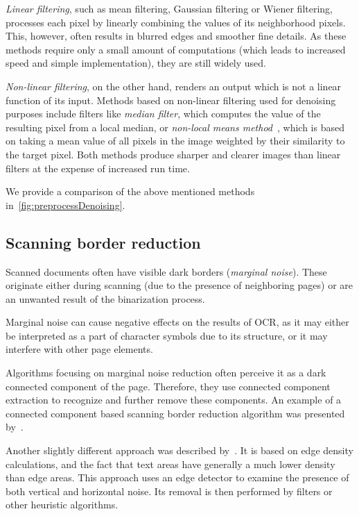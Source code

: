 \emph{Linear filtering}, such as mean filtering, Gaussian filtering or Wiener filtering, processes each pixel by linearly combining the values of its neighborhood pixels. This, however, often results in blurred edges and smoother fine details. As these methods require only a small amount of computations (which leads to increased speed and simple implementation), they are still widely used.

\emph{Non-linear filtering}, on the other hand, renders an output which is not a linear function of its input. Methods based on non-linear filtering used for denoising purposes include filters like \emph{median filter}, which computes the value of the resulting pixel from a local median, or \emph{non-local means method}~\citep{nonLocalMeans}, which is based on taking a mean value of all pixels in the image weighted by their similarity to the target pixel. Both methods produce sharper and clearer images than linear filters at the expense of increased run time.

We provide a comparison of the above mentioned methods in~\cref{fig:preprocessDenoising}.

\subsection{Scanning border reduction}

Scanned documents often have visible dark borders (\emph{marginal noise}). These originate either during scanning (due to the presence of neighboring pages) or are an unwanted result of the binarization process. 

Marginal noise can cause negative effects on the results of OCR, as it may either be interpreted as a part of character symbols due to its structure, or it may interfere with other page elements.

Algorithms focusing on marginal noise reduction often perceive it as a dark connected component of the page. Therefore, they use connected component extraction to recognize and further remove these components. An example of a connected component based scanning border reduction algorithm was presented by~\citet{marginalNoiseWindow}.

Another slightly different approach was described by~\citet{marginalNoiseEdge}. It is based on edge density calculations, and the fact that text areas have generally a much lower density than edge areas. This approach uses an edge detector to examine the presence of both vertical and horizontal noise. Its removal is then performed by filters or other heuristic algorithms.

